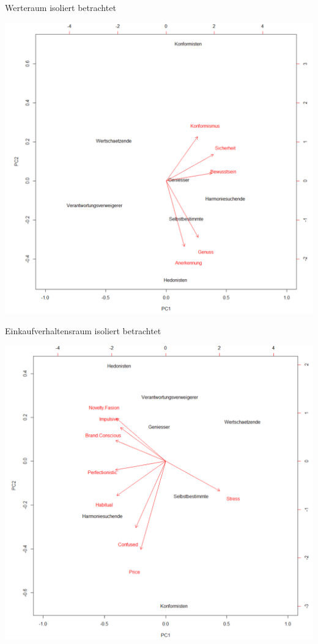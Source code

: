 \documentclass[12pt,ngerman,a4paper,ignorenonframetext,]{beamer}
\begin{document}
\begin{frame}[shrink]{Werteraum isoliert betrachtet}
\protect\hypertarget{werteraum-isoliert-betrachtet}{}

\begin{center}\includegraphics[width=0.8\linewidth]{./images/Marketingcontrolling/Werteverhaltensraum} \end{center}

\end{frame}

\begin{frame}[shrink]{Einkaufverhaltensraum isoliert betrachtet}
\protect\hypertarget{einkaufverhaltensraum-isoliert-betrachtet}{}

\begin{center}\includegraphics[width=0.8\linewidth]{./images/Marketingcontrolling/Einkaufverhaltensraum} \end{center}

\end{frame}
\end{document}
